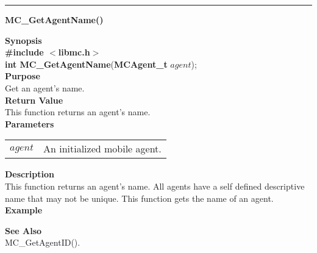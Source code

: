 \noindent
\vspace{5pt}
\rule{6.5in}{0.015in}
\noindent
{}
{\LARGE \bf MC\_GetAgentName()}\\
\label{api:MC_GetAgentName()}

\noindent
{\bf Synopsis}\\
{\bf \#include $<$libmc.h$>$}\\
{\bf int MC\_GetAgentName}({\bf MCAgent\_t} $agent$);\\

\noindent
{\bf Purpose}\\
Get an agent's name. \\

\noindent
{\bf Return Value}\\
This function returns an agent's name. \\

\noindent
{\bf Parameters}
\vspace{-0.1in}
\begin{description}
\item
\begin{tabular}{p{10 mm}p{145 mm}} 
$agent$ & An initialized mobile agent.
\end{tabular}
\end{description}

\noindent
{\bf Description}\\
This function returns an agent's name. All agents have a self defined
descriptive name that may not be unique. This function gets the name of
an agent.\\

\noindent
{\bf Example}\\
\noindent

\noindent
{\bf See Also}\\
MC\_GetAgentID().

